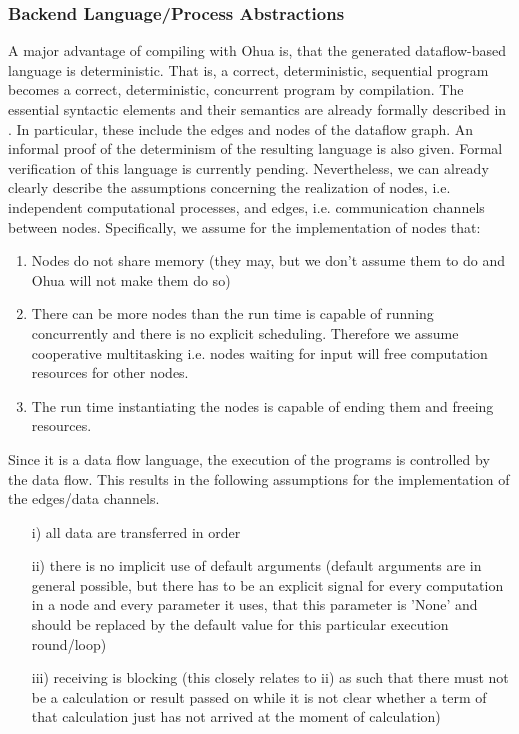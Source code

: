 \subsubsection{Backend Language/Process Abstractions}
A major advantage of compiling with Ohua is, that the generated dataflow-based language is deterministic. That is, a correct, deterministic, sequential program becomes a correct, deterministic, concurrent program by compilation. 
The essential syntactic elements and their semantics are already formally described in . In particular, these include the edges and nodes of the dataflow graph. An informal proof of the determinism of the resulting language is also given. 
Formal verification of this language is currently pending. Nevertheless, we can already clearly describe the assumptions concerning the realization of nodes, i.e. independent computational processes, and edges, i.e. communication channels between nodes.
Specifically, we assume for the implementation of nodes that:
\begin{enumerate}
    \item Nodes do not share memory (they may, but we don't assume them to do and Ohua will not make them do so)
    \item There can be more nodes than the run time is capable of running concurrently and there is no explicit scheduling. Therefore we assume cooperative multitasking i.e. nodes waiting for input will free computation resources for other nodes.
    \item {} The run time instantiating the nodes is capable of ending them and freeing resources.
\end{enumerate}

Since it is a data flow language, the execution of the programs is controlled by the data flow. This results in the following assumptions for the implementation of the edges/data channels. 
\begin{itemize}
    \item[i)] all data are transferred in order
    \item[ii)] there is no implicit use of default arguments (default arguments are in general possible, but there has to be an explicit signal for every computation in a node and every parameter it uses, that this parameter is 'None' and should be replaced by the default value for this particular execution round/loop)
    \item[iii)] receiving is blocking (this closely relates to ii) as such that there must not be a calculation or result passed on while it is not clear whether a term of that calculation just has not arrived at the moment of calculation) 
\end{itemize}


